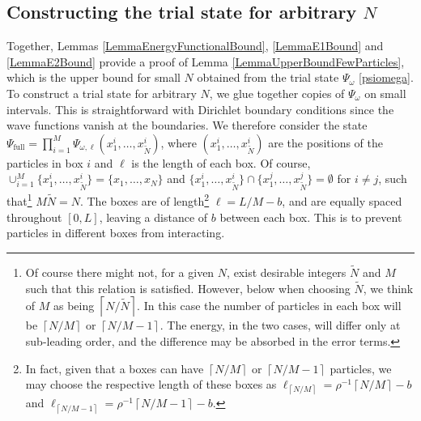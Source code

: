 \documentclass[a4paper,11pt]{article}
\newcommand{\ceil}[1]{\left\lceil #1 \right\rceil}
\numberwithin{equation}{section}
\begin{document}
	\subsection{Constructing the trial state for arbitrary $N$}
	\label{secarbN}
	Together, Lemmas \ref{LemmaEnergyFunctionalBound}, \ref{LemmaE1Bound} and \ref{LemmaE2Bound} provide a proof of Lemma \ref{LemmaUpperBoundFewParticles}, which is the upper bound for small $N$ obtained from the trial state $\Psi_\omega$ \eqref{psiomega}. To construct a trial state for arbitrary $N$, we glue together copies of $\Psi_\omega$ on small intervals. This is straightforward with Dirichlet boundary conditions since the wave functions vanish at the boundaries. We therefore consider the state $ \Psi_{\text{full}}=\prod_{i=1}^{M}\Psi_{\omega,\ell}(x^i_1,\dots,x^i_{\tilde{N}}) $, where $ (x_1^i,\dots,x_{\tilde{N}}^i) $ are the positions of the particles in box $ i $ and $ \ell $ is the length of each box. Of course, $ \cup_{i=1}^{M}\{x_1^i,\dots,x_{\tilde{N}}^i\}=\{x_1,\dots,x_N\} $ and $ \{x_1^i,\dots,x_{\tilde{N}}^i\}\cap\{x_1^j,\dots,x_{\tilde{N}}^j\}=\emptyset $ for $ i\neq j $, such that\footnote{Of course there might not, for a given $N$, exist desirable integers $\tilde{N}$ and $M$ such that this relation is satisfied. However, below when choosing $\tilde{N}$, we think of $M$ as being $\ceil{N/\tilde{N}}$. In this case the number of particles in each box will be $\ceil{N/M}$ or $\ceil{N/M-1}$. The energy, in the two cases, will differ only at sub-leading order, and the difference may be absorbed in the error terms.} $ M\tilde{N}=N $. The boxes are of length\footnote{ In fact, given that a boxes can have $\ceil{N/M}$ or $\ceil{N/M-1}$ particles, we may choose the respective length of these boxes as $\ell_{\ceil{N/M}}=\rho^{-1}\ceil{N/M}-b$ and $\ell_{\ceil{N/M-1}}=\rho^{-1}\ceil{N/M-1}-b$.} $ \ell=L/M-b $, and are equally spaced throughout $ [0,L] $, leaving a distance of $ b $ between each box. This is to prevent particles in different boxes from interacting.
	
\end{document}
